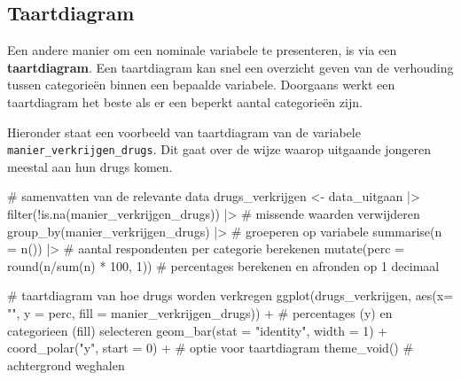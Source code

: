 \documentclass[
  letterpaper,
  DIV=11,
  numbers=noendperiod]{scrreprt}
\newenvironment{Shaded}{\begin{snugshade}}{\end{snugshade}}
\newcommand{\AttributeTok}[1]{\textcolor[rgb]{0.40,0.45,0.13}{#1}}
\newcommand{\CommentTok}[1]{\textcolor[rgb]{0.37,0.37,0.37}{#1}}
\newcommand{\DecValTok}[1]{\textcolor[rgb]{0.68,0.00,0.00}{#1}}
\newcommand{\FunctionTok}[1]{\textcolor[rgb]{0.28,0.35,0.67}{#1}}
\newcommand{\NormalTok}[1]{\textcolor[rgb]{0.00,0.23,0.31}{#1}}
\newcommand{\OtherTok}[1]{\textcolor[rgb]{0.00,0.23,0.31}{#1}}
\newcommand{\SpecialCharTok}[1]{\textcolor[rgb]{0.37,0.37,0.37}{#1}}
\newcommand{\StringTok}[1]{\textcolor[rgb]{0.13,0.47,0.30}{#1}}
\begin{document}
\subsection{Taartdiagram}\label{taartdiagram}

Een andere manier om een nominale variabele te presenteren, is via een
\textbf{taartdiagram}. Een taartdiagram kan snel een overzicht geven van
de verhouding tussen categorieën binnen een bepaalde variabele.
Doorgaans werkt een taartdiagram het beste als er een beperkt aantal
categorieën zijn.

Hieronder staat een voorbeeld van taartdiagram van de variabele
\texttt{manier\_verkrijgen\_drugs}. Dit gaat over de wijze waarop
uitgaande jongeren meestal aan hun drugs komen.

\begin{Shaded}
\begin{Highlighting}[]
\CommentTok{\# samenvatten van de relevante data}
\NormalTok{drugs\_verkrijgen }\OtherTok{\textless{}{-}}\NormalTok{ data\_uitgaan }\SpecialCharTok{|\textgreater{}}
  \FunctionTok{filter}\NormalTok{(}\SpecialCharTok{!}\FunctionTok{is.na}\NormalTok{(manier\_verkrijgen\_drugs)) }\SpecialCharTok{|\textgreater{}} \CommentTok{\# missende waarden verwijderen}
  \FunctionTok{group\_by}\NormalTok{(manier\_verkrijgen\_drugs) }\SpecialCharTok{|\textgreater{}} \CommentTok{\# groeperen op variabele}
  \FunctionTok{summarise}\NormalTok{(}\AttributeTok{n =} \FunctionTok{n}\NormalTok{()) }\SpecialCharTok{|\textgreater{}} \CommentTok{\# aantal respondenten per categorie berekenen}
  \FunctionTok{mutate}\NormalTok{(}\AttributeTok{perc =} \FunctionTok{round}\NormalTok{(n}\SpecialCharTok{/}\FunctionTok{sum}\NormalTok{(n) }\SpecialCharTok{*} \DecValTok{100}\NormalTok{, }\DecValTok{1}\NormalTok{)) }\CommentTok{\# percentages berekenen en afronden op 1 decimaal}

\CommentTok{\# taartdiagram van hoe drugs worden verkregen}
\FunctionTok{ggplot}\NormalTok{(drugs\_verkrijgen, }\FunctionTok{aes}\NormalTok{(}\AttributeTok{x=} \StringTok{""}\NormalTok{, }\AttributeTok{y =}\NormalTok{ perc, }\AttributeTok{fill =}\NormalTok{ manier\_verkrijgen\_drugs)) }\SpecialCharTok{+} 
  \CommentTok{\# percentages (y) en categorieen (fill) selecteren}
  \FunctionTok{geom\_bar}\NormalTok{(}\AttributeTok{stat =} \StringTok{"identity"}\NormalTok{, }\AttributeTok{width =} \DecValTok{1}\NormalTok{) }\SpecialCharTok{+}
  \FunctionTok{coord\_polar}\NormalTok{(}\StringTok{"y"}\NormalTok{, }\AttributeTok{start =} \DecValTok{0}\NormalTok{) }\SpecialCharTok{+} \CommentTok{\# optie voor taartdiagram }
  \FunctionTok{theme\_void}\NormalTok{() }\CommentTok{\# achtergrond weghalen}
\end{Highlighting}
\end{Shaded}
\end{document}
